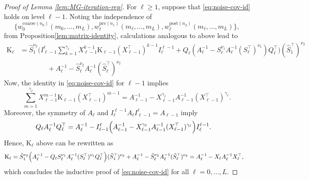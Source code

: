 \documentclass[11pt,english]{article}
\theoremstyle{plain}
\theoremstyle{plain}
\theoremstyle{plain}
\theoremstyle{plain}
\numberwithin{equation}{section}
\newcommand*{\WCov}{\mathrm{K}}
\begin{document}
\begin{proof}[Proof of Lemma \ref{lem:MG-iteration-rep}]
	For $\ell\geq1$, suppose that \eqref{eq:noise-cov-id} holds
	on level $\ell-1$. Noting the independence of
	\[
		\{w_{0}^{\mathrm{coarse}(n_0)}(m_0,\dots,m_L),w_{\ell}^{\mathrm{pre}(n_1)}(m_\ell,\dots,m_L),w_{\ell}^{\mathrm{post}(n_2)}(m_\ell,\dots,m_L)\},
	\]
	from Proposition\ref{lem:matrix-identity}, calculations analogous to above
	lead to
	\begin{align*}
		\WCov_{\ell} & =\hat{S}_{1}^{\nu_{2}}\biggl(I_{\ell-1}^{\ell}\sum_{k=1}^{\gamma_{\ell}}X_{\ell-1}^{k-1}\WCov_{\ell-1}(X_{\ell-1}^{\top})^{k-1}I_{\ell}^{\ell-1}+Q_{\ell}(A_{\ell}^{-1}-S_{\ell}^{\nu_{1}}A_{\ell}^{-1}(S_{\ell}^{\top})^{\nu_{1}})Q_{\ell}^{\top}\biggr)(\hat{S}_{1}^{\top})^{\nu_{2}} \\
		             & \qquad\qquad+A_{\ell}^{-1}-\hat{S}_{\ell}^{\nu_{2}}A_{\ell}^{-1}(\hat{S}_{\ell}^{\top})^{\nu_{2}}
	\end{align*}
	Now, the identity in \eqref{eq:noise-cov-id} for $\ell-1$ implies
	\[
		\sum_{m=1}^{\gamma_{\ell}}X_{\ell-1}^{m-1}\WCov_{\ell-1}(X_{\ell-1}^{\top})^{m-1}=A_{\ell-1}^{-1}-X_{\ell-1}^{\gamma_{\ell}}A_{\ell-1}^{-1}(X_{\ell-1}^{\top})^{\gamma_{\ell}}.
	\]
	Moreover, the symmetry of $A_{\ell}$ and $I_{\ell}^{\ell-1}A_{\ell}I_{\ell-1}^{\ell}=A_{\ell-1}$
	imply
	\begin{align*}
		Q_{\ell}A_{\ell}^{-1}Q_{\ell}^{\top}
		 & =A_{\ell}^{-1}-I_{\ell-1}^{\ell}\Bigl(A_{\ell-1}^{-1}-X_{\ell-1}^{\gamma_{\ell}}A_{\ell-1}^{-1}(X_{\ell-1}^{\top})^{\gamma_{\ell}}\Bigr)I_{\ell}^{\ell-1}.
	\end{align*}
	Hence, $\WCov_{\ell}$ above can be rewritten as
	\begin{align*}
		\WCov_{\ell} & =\hat{S}_{1}^{\nu_{2}}\Bigl(A_{\ell}^{-1}-Q_{\ell}S_{\ell}^{\nu_{1}}A_{\ell}^{-1}(S_{\ell}^{\top})^{\nu_{1}}Q_{\ell}^{\top}\Bigr)(\hat{S}_{1}^{\top})^{\nu_{2}}+A_{\ell}^{-1}-\hat{S}_{\ell}^{\nu_{2}}A_{\ell}^{-1}(\hat{S}_{\ell}^{\top})^{\nu_{2}} =A_{\ell}^{-1}-X_{\ell}A_{\ell}^{-1}X_{\ell}^{\top},
	\end{align*}
	which concludes the inductive proof of \eqref{eq:noise-cov-id} for all
	$\ell=0,\dots,L$.
\end{proof}
\end{document}
